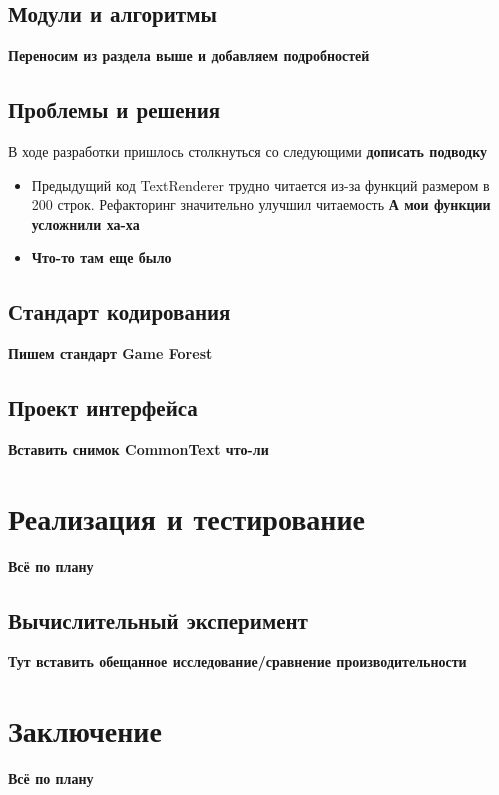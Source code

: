 \documentclass{fefu}
\begin{document}
		\subsection{Модули и алгоритмы}
			\textbf{Переносим из раздела выше и добавляем подробностей}
		\subsection{Проблемы и решения}
			\par В ходе разработки пришлось столкнуться со следующими \textbf{дописать 
			подводку}
			\begin{itemize}
				\item Предыдущий код TextRenderer трудно читается из-за функций размером в
				200 строк. Рефакторинг значительно улучшил читаемость \textbf{А мои функции 
				усложнили ха-ха}
				\item \textbf{Что-то там еще было}
			\end{itemize}
		\subsection{Стандарт кодирования}
			\textbf{Пишем стандарт Game Forest}
		\subsection{Проект интерфейса}
			\textbf{Вставить снимок CommonText что-ли}
	\section{Реализация и тестирование}
		\textbf{Всё по плану}
		\subsection{Вычислительный эксперимент}
			\textbf{Тут вставить обещанное исследование/сравнение производительности}
	\section*{Заключение}
		\textbf{Всё по плану}
	\newpage
	
	
	
\end{document}
